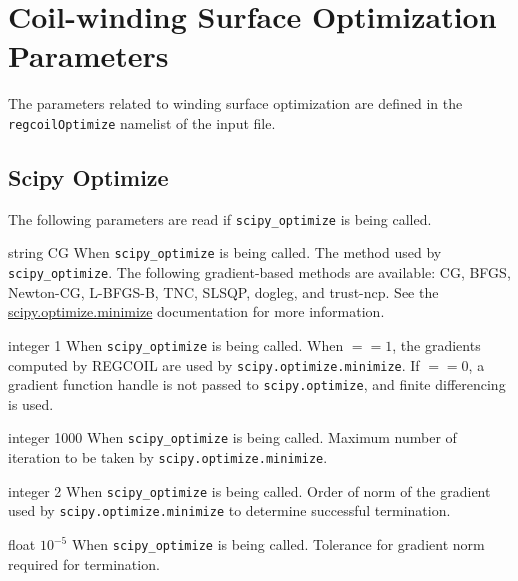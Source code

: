 \myhrule

\section{Coil-winding Surface Optimization Parameters}

\myhrule

The parameters related to winding surface optimization are defined in the \texttt{regcoilOptimize} namelist of the input file. 

\myhrule

\subsection{Scipy Optimize}

The following parameters are read if \texttt{scipy\_optimize} is being called. 

{string}
{CG}
{When \texttt{scipy\_optimize} is being called.}
{The method used by \texttt{scipy\_optimize}. The following gradient-based methods are available: CG, BFGS, Newton-CG, L-BFGS-B, TNC, SLSQP, dogleg, and trust-ncp. See the \\
\href{https://docs.scipy.org/doc/scipy/reference/generated/scipy.optimize.minimize.html}{scipy.optimize.minimize} documentation for more information.}

\myhrule

{integer}
{1}
{When \texttt{scipy\_optimize} is being called.}
{When  $ == 1$, the gradients computed by REGCOIL are used by \texttt{scipy.optimize.minimize}. If  $ == 0$, a gradient function handle is not passed to \texttt{scipy.optimize}, and finite differencing is used.}

\myhrule

{integer}
{1000}
{When \texttt{scipy\_optimize} is being called.}
{Maximum number of iteration to be taken by \texttt{scipy.optimize.minimize}.}

\myhrule

{integer}
{2}
{When \texttt{scipy\_optimize} is being called.}
{Order of norm of the gradient used by \texttt{scipy.optimize.minimize} to determine successful termination.}

\myhrule

{float}
{$10^{-5}$}
{When \texttt{scipy\_optimize} is being called.}
{Tolerance for gradient norm required for termination.}


